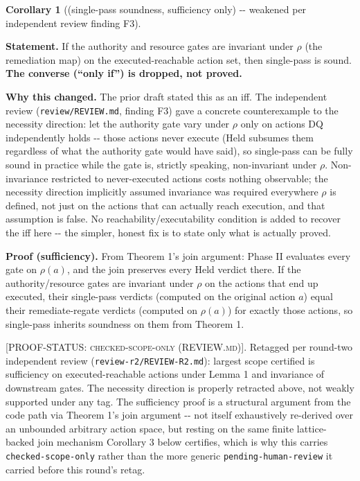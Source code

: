 \documentclass[11pt,a4paper]{article}
\theoremstyle{definition}
\newtheorem{corollary}{Corollary}
\newcommand{\proofstatus}[1]{[\textsc{PROOF-STATUS}: \textsc{#1}]}
\begin{document}
\setcounter{corollary}{0}
\begin{corollary}[(single-pass soundness, sufficiency only) -{}- weakened per independent review finding F3]
\label{cor:1}

\noindent\textbf{Statement.} If the authority and resource gates are invariant under $\rho$ (the remediation map) on the executed-reachable action set, then single-pass is sound. \textbf{The converse (``only if'') is dropped, not proved.}

\noindent\textbf{Why this changed.} The prior draft stated this as an iff. The independent review (\texttt{review/REVIEW.md}, finding F3) gave a concrete counterexample to the necessity direction: let the authority gate vary under $\rho$ only on actions DQ independently holds -{}- those actions never execute (Held subsumes them regardless of what the authority gate would have said), so single-pass can be fully sound in practice while the gate is, strictly speaking, non-invariant under $\rho$. Non-invariance restricted to never-executed actions costs nothing observable; the necessity direction implicitly assumed invariance was required everywhere $\rho$ is defined, not just on the actions that can actually reach execution, and that assumption is false. No reachability/executability condition is added to recover the iff here -{}- the simpler, honest fix is to state only what is actually proved.

\noindent\textbf{Proof (sufficiency).} From Theorem 1's join argument: Phase II evaluates every gate on $\rho(a)$, and the join preserves every Held verdict there. If the authority/resource gates are invariant under $\rho$ on the actions that end up executed, their single-pass verdicts (computed on the original action $a$) equal their remediate-regate verdicts (computed on $\rho(a)$) for exactly those actions, so single-pass inherits soundness on them from Theorem 1.

\proofstatus{checked-scope-only (REVIEW.md)}. Retagged per round-two independent review (\texttt{review-r2/REVIEW-R2.md}): largest scope certified is sufficiency on executed-reachable actions under Lemma 1 and invariance of downstream gates. The necessity direction is properly retracted above, not weakly supported under any tag. The sufficiency proof is a structural argument from the code path via Theorem 1's join argument -{}- not itself exhaustively re-derived over an unbounded arbitrary action space, but resting on the same finite lattice-backed join mechanism Corollary 3 below certifies, which is why this carries \texttt{checked-scope-only} rather than the more generic \texttt{pending-human-review} it carried before this round's retag.
\end{corollary}
\end{document}
